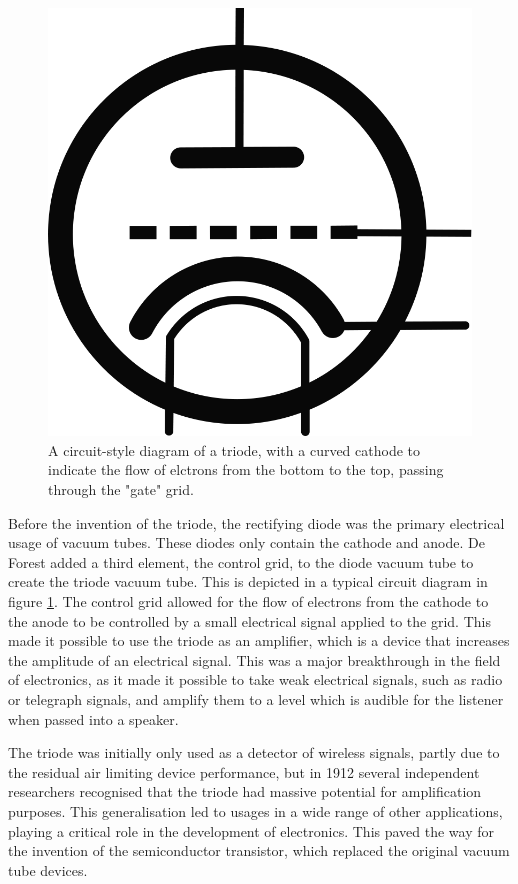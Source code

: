 \begin{figure}
    \centering
    \includegraphics[width=0.4\linewidth]{gfx/Triode_symbol.png}
    \caption{A circuit-style diagram of a triode, with a curved cathode to indicate the flow of elctrons from the bottom to the top, passing through the "gate" grid.}
    \label{fig:triode_symbol}
\end{figure}

Before the invention of the triode, the rectifying diode was the primary electrical usage of vacuum tubes. These diodes only contain the cathode and anode. De Forest added a third element, the control grid, to the diode vacuum tube to create the triode vacuum tube. This is depicted in a typical circuit diagram in figure \ref{fig:triode_symbol}. The control grid allowed for the flow of electrons from the cathode to the anode to be controlled by a small electrical signal applied to the grid. This made it possible to use the triode as an amplifier, which is a device that increases the amplitude of an electrical signal. This was a major breakthrough in the field of electronics, as it made it possible to take weak electrical signals, such as radio or telegraph signals, and amplify them to a level which is audible for the listener when passed into a speaker.

The triode was initially only used as a detector of wireless signals, partly due to the residual air limiting device performance, but in 1912 several independent researchers recognised that the triode had massive potential for amplification purposes. This generalisation led to usages in a wide range of other applications, playing a critical role in the development of electronics. This paved the way for the invention of the semiconductor transistor, which replaced the original vacuum tube devices.

